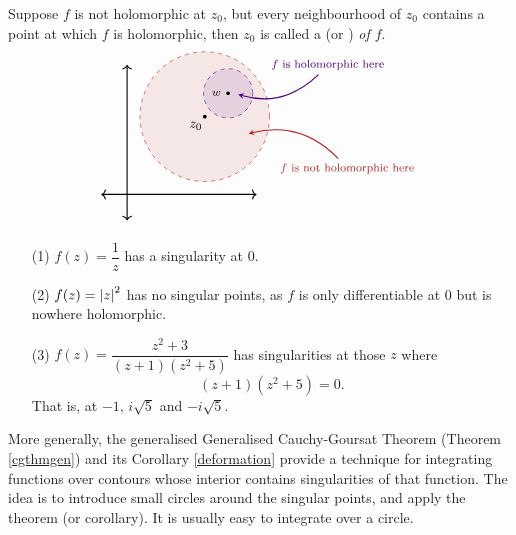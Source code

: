 \medskip

\begin{definition}[Singularities]
Suppose $f$ is not holomorphic at $z_0$, but every neighbourhood of $z_0$ contains a point at which $f$ is holomorphic, then $z_0$ is called a  (or ) \emph{of $f$}.\\[1em]
\[\begin{tikzpicture}[scale=0.65]
    \draw[<->,thick] (-1,0)--(5,0);
	\draw[<->,thick] (0,-1)--(0,5);
	\filldraw[firebrick,fill opacity=1/10,dashed](3,3) circle (2.5);
    \fill (3,3) circle (2pt);
    \node[] at (2.65,2.65) {$z_0$};
	\filldraw[indigo,fill opacity=1/10,dashed](3.9,3.9) circle (0.95);
    \fill (3.9,3.9) circle (2pt);
    \node[] at (3.45,3.9) {\footnotesize$w$};
    \node[] (3) at (8.5,1) {\footnotesize\color{firebrick}$f$ is not holomorphic here};
    \node[] (1) at (7.75,5) {\footnotesize\color{indigo}$f$ is holomorphic here};
    \node[] (2) at (4.1,3.9) {};
    \node[] (4) at (4.5,2.3) {};
	\path[every node/.style={font=\sffamily\small},<-,>=stealth, thick,indigo]
    (2) edge[bend right] node [left] {} (1);
    \path[every node/.style={font=\sffamily\small},->,>=stealth, thick,firebrick]
    (3) edge[bend right] node [left] {} (4);
  \end{tikzpicture}\]
\end{definition}

\medskip

\begin{example}\hfill
\begin{itemize}
\item[(1)] $f(z) = \dfrac{1}{z}$ has a singularity at $0$.
\item[(2)] $f(z) = \left\lvert z\right\rvert^2$ has no singular points, as $f$ is only differentiable at $0$ but is nowhere holomorphic.
\item[(3)] $f(z) = \dfrac{z^2 + 3}{(z + 1)(z^2 + 5)}$ has singularities at those $z$ where
\[(z + 1)(z^2 + 5) = 0.\]
That is, at $-1,\, i\sqrt{5}$ and $-i\sqrt{5}$.
\end{itemize}
\end{example}

\medskip

\begin{remark}
More generally, the generalised Generalised Cauchy-Goursat Theorem (Theorem \ref{cgthmgen}) and its Corollary \ref{deformation} provide a technique for integrating functions over contours whose interior contains singularities of that function. The idea is to introduce small circles around the singular points, and apply the theorem (or corollary). It is usually easy to integrate over a circle. 
\end{remark}

